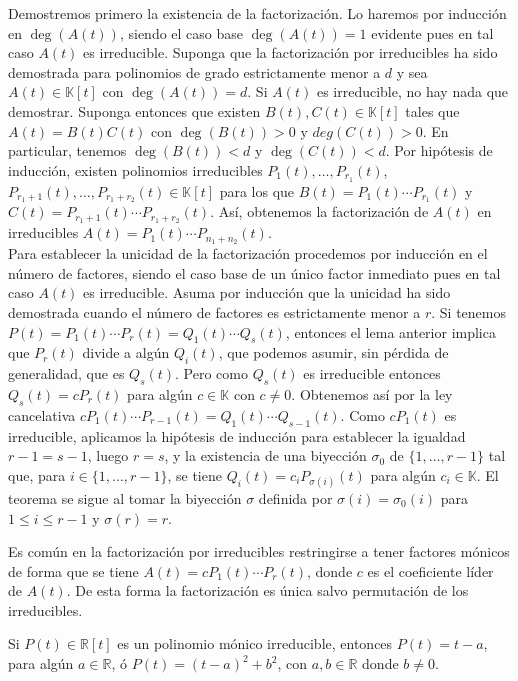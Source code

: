 \dem Demostremos primero la existencia de la factorización. Lo haremos por inducción en $\deg(A(t))$, siendo el caso base $\deg(A(t))=1$ evidente pues en tal caso $A(t)$ es irreducible. Suponga que la factorización por irreducibles ha sido demostrada para polinomios de grado estrictamente menor a $d$ y sea $A(t)\in \mathbb{K}[t]$ con $\deg(A(t))=d$. Si $A(t)$ es irreducible, no hay nada que demostrar. Suponga entonces que existen $B(t),C(t)\in \mathbb{K}[t]$ tales que $A(t)=B(t)C(t)$ con $\deg(B(t))>0$ y $deg(C(t))>0$. En particular, tenemos $\deg(B(t))<d$ y $\deg(C(t))<d$. Por hipótesis de inducción, existen polinomios irreducibles $P_1(t),\ldots,P_{r_1}(t)$, $P_{r_1+1}(t),\ldots,P_{r_1+r_2}(t)\in \mathbb{K}[t]$ para los que $B(t)=P_1(t)\cdots P_{r_1}(t)$ y $C(t)=P_{r_1+1}(t)\cdots P_{r_1+r_2}(t)$. Así, obtenemos la factorización de $A(t)$ en irreducibles $A(t)=P_1(t)\cdots P_{n_1+n_2}(t)$.\\
Para establecer la unicidad de la factorización procedemos por inducción en el número de factores, siendo el caso base de un único factor inmediato pues en tal caso $A(t)$ es irreducible. Asuma por inducción que la unicidad ha sido demostrada cuando el número de factores es estrictamente menor a $r$. Si tenemos $P(t)=P_1(t)\cdots P_r(t)=Q_1(t)\cdots Q_s(t)$, entonces el lema anterior implica que $P_r(t)$ divide a algún $Q_i(t)$, que podemos asumir, sin pérdida de generalidad, que es $Q_s(t)$. Pero como $Q_s(t)$ es irreducible entonces $Q_s(t)=cP_r(t)$ para algún $c\in \mathbb{K}$ con $c\ne 0$. Obtenemos así por la ley cancelativa $cP_1(t)\cdots P_{r-1}(t)=Q_1(t)\cdots Q_{s-1}(t)$. Como $cP_1(t)$ es irreducible, aplicamos la hipótesis de inducción para establecer la igualdad $r-1=s-1$, luego $r=s$, y la existencia de una biyección $\sigma_0$ de $\{1,\ldots,r-1\}$ tal que, para $i\in\{1,\ldots,r-1\}$, se tiene $Q_i(t)=c_iP_{\sigma(i)}(t)$ para algún $c_i\in \mathbb{K}$. El teorema se sigue al tomar la biyección $\sigma$ definida por $\sigma(i)=\sigma_0(i)$ para $1\le i\le r-1$ y $\sigma(r)=r$.

\begin{obs}
  Es común en la factorización por irreducibles restringirse a tener factores mónicos de forma que se tiene
  $A(t)=cP_1(t)\cdots P_r(t)$, donde $c$ es el coeficiente líder de $A(t)$. De esta forma la factorización es única salvo permutación de los irreducibles. 
\end{obs}

\begin{teo}
Si $P(t)\in\mathbb{R}[t]$ es un polinomio mónico irreducible, entonces $P(t)=t-a$, para algún $a\in\mathbb{R}$, ó $P(t)=(t-a)^2+b^2$, con $a,b\in\mathbb{R}$ donde $b\ne 0$. 
\end{teo}

